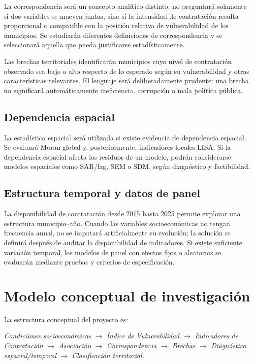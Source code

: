 \documentclass[11pt,letterpaper]{article}
\begin{document}
La correspondencia será un concepto analítico distinto: no preguntará
solamente si dos variables se mueven juntas, sino si la intensidad de
contratación resulta proporcional o compatible con la posición relativa de
vulnerabilidad de los municipios. Se estudiarán diferentes definiciones de
correspondencia y se seleccionará aquella que pueda justificarse
estadísticamente.

Las brechas territoriales identificarán municipios cuyo nivel de contratación
observado sea bajo o alto respecto de lo esperado según su vulnerabilidad y
otras características relevantes. El lenguaje será deliberadamente prudente:
una brecha no significará automáticamente ineficiencia, corrupción o mala
política pública.

\subsection{Dependencia espacial}

La estadística espacial será utilizada si existe evidencia de dependencia
espacial. Se evaluará Moran global y, posteriormente, indicadores locales
LISA. Si la dependencia espacial afecta los residuos de un modelo, podrán
considerarse modelos espaciales como SAR/lag, SEM o SDM, según diagnóstico y
factibilidad.

\subsection{Estructura temporal y datos de panel}

La disponibilidad de contratación desde 2015 hasta 2025 permite explorar una
estructura municipio--año. Cuando las variables socioeconómicas no tengan
frecuencia anual, no se imputará artificialmente su evolución; la solución se
definirá después de auditar la disponibilidad de indicadores. Si existe
suficiente variación temporal, los modelos de panel con efectos fijos o
aleatorios se evaluarán mediante pruebas y criterios de especificación.

\section{Modelo conceptual de investigación}

La estructura conceptual del proyecto es:

\begin{center}
\itshape
Condiciones socioeconómicas $\rightarrow$ Índice de Vulnerabilidad
$\rightarrow$ Indicadores de Contratación $\rightarrow$ Asociación
$\rightarrow$ Correspondencia $\rightarrow$ Brechas $\rightarrow$
Diagnóstico espacial/temporal $\rightarrow$ Clasificación territorial.
\end{center}
\end{document}
